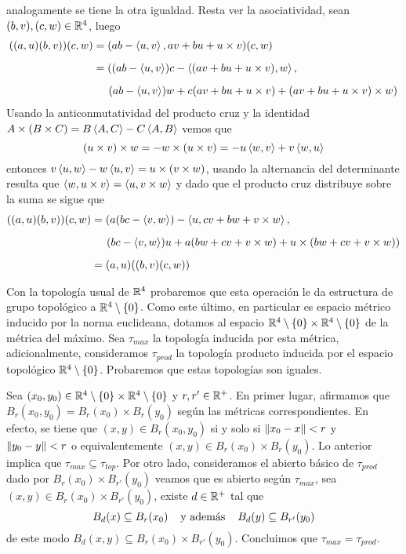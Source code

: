 \documentclass{article}
\begin{document}
analogamente se tiene la otra igualdad. Resta ver la asociatividad, sean $(b,v),(c,w)\in\mathbb{R}^{4}$, 
luego
\begin{align*}
    ((a,u)(b,v))(c,w) &= (ab-\left\langle{u},{v}\right\rangle,av+bu+u\times v)(c,w) \\[2mm]
    &= ((ab-\left\langle{u},{v}\right\rangle)c-\left\langle{(av+bu+u\times v)},{w}\right\rangle, \\[2mm]
    &\hspace{5mm}(ab-\left\langle{u},{v}\right\rangle)w+c(av+bu+u\times v)+(av+bu+u\times v)\times w)
\end{align*}
Usando la anticonmutatividad del producto cruz y la identidad $A\times(B\times C)
=B\left\langle{A},{C}\right\rangle-C\left\langle{A},{B}\right\rangle$ vemos que
\begin{equation*}
    (u\times v)\times w=-w\times(u\times v)=-u\left\langle{w},{v}\right\rangle+v\left\langle{w},{u}\right\rangle
\end{equation*}
entonces $v\left\langle{u},{w}\right\rangle-w\left\langle{u},{v}\right\rangle=u\times(v\times w)$, usando la alternancia del determinante 
resulta que $\left\langle{w},{u\times v}\right\rangle=\left\langle{u},{v\times w}\right\rangle$ y dado que el producto cruz distribuye sobre la
suma se sigue que
\begin{align*}
    ((a,u)(b,v))(c,w) &= (a(bc-\left\langle{v},{w}\right\rangle)-\left\langle{u},{cv+bw+v\times w}\right\rangle, \\[2mm]
    &\hspace{5mm}(bc-\left\langle{v},{w}\right\rangle)u+a(bw+cv+v\times w)+u\times(bw+cv+v\times w)) \\[2mm]
    &= (a,u)((b,v)(c,w))
\end{align*}

\noindent Con la topología usual de $\mathbb{R}^{4}$ probaremos que esta operación le da estructura de 
grupo topológico a $\mathbb{R}^{4}\setminus\{0\}$. Como este último, en particular es espacio métrico
inducido por la norma euclideana, dotamos al espacio 
$\mathbb{R}^{4}\setminus\{0\}\times\mathbb{R}^{4}\setminus\{0\}$ de la métrica del máximo. Sea $\tau_{max}$ la 
topología inducida por esta métrica, adicionalmente, consideramos $\tau_{prod}$ la topología 
producto inducida por el espacio topológico $\mathbb{R}^{4}\setminus\{0\}$. Probaremos que estas 
topologías son iguales.

\vspace{2mm}
\noindent Sea $(x_{0},y_{0})\in\mathbb{R}^{4}\setminus\{0\}\times\mathbb{R}^{4}\setminus\{0\}$ y $r,r'\in\mathbb{R}^{+}$. 
En primer lugar, afirmamos que $B_{r}(x_{0},y_{0})=B_{r}(x_{0})\times B_{r}(y_{0})$ según las 
métricas correspondientes. En efecto, se tiene que $(x,y)\in B_{r}(x_{0},y_{0})$ si y solo si 
$\left \lVert x_{0}-x\right \rVert<r$ y $\left \lVert y_{0}-y\right \rVert<r$ o equivalentemente $(x,y)\in B_{r}(x_{0})\times 
B_{r}(y_{0})$. Lo anterior implica que $\tau_{max}\subseteq\tau_{top}$. Por otro lado, 
consideramos el abierto básico de $\tau_{prod}$ dado por $B_{r}(x_{0})\times B_{r'}(y_{0})$ veamos 
que es abierto según $\tau_{max}$, sea $(x,y)\in B_{r}(x_{0})\times B_{r'}(y_{0})$, existe 
$d\in\mathbb{R}^{+}$ tal que
\begin{equation*}
    B_{d}(x)\subseteq B_{r}(x_{0})
    \hspace{4mm}\text{y además}\hspace{4mm}
    B_{d}(y)\subseteq B_{r'}(y_{0})
\end{equation*}
de este modo $B_{d}(x,y)\subseteq B_{r}(x_{0})\times B_{r'}(y_{0})$. Concluimos que 
$\tau_{max}=\tau_{prod}$.
\end{document}
